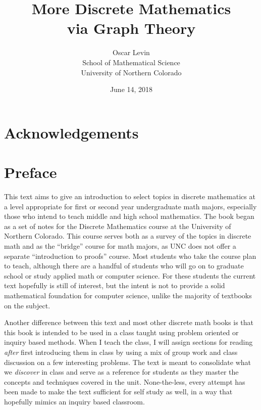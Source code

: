 \documentclass[10pt,]{book}
\title{More Discrete Mathematics\\
{\large via Graph Theory}}
\author{Oscar Levin\\
School of Mathematical Science\\
University of Northern Colorado
}
\date{June 14, 2018}
\theoremstyle{plain}
\theoremstyle{definition}
\theoremstyle{definition}
\theoremstyle{definition}
\theoremstyle{definition}
\numberwithin{equation}{chapter}
\begin{document}
\frontmatter


\chapter*{Acknowledgements}\label{acknowledgement-1}
\chapter*{Preface}\label{preface}
\hypertarget{p-1}{}%
This text aims to give an introduction to select topics in discrete mathematics at a level appropriate for first or second year undergraduate math majors, especially those who intend to teach middle and high school mathematics. The book began as a set of notes for the Discrete Mathematics course at the University of Northern Colorado. This course serves both as a survey of the topics in discrete math and as the ``bridge'' course for math majors, as UNC does not offer a separate ``introduction to proofs'' course. Most students who take the course plan to teach, although there are a handful of students who will go on to graduate school or study applied math or computer science. For these students the current text hopefully is still of interest, but the intent is not to provide a solid mathematical foundation for computer science, unlike the majority of textbooks on the subject.%
\par
\hypertarget{p-2}{}%
Another difference between this text and most other discrete math books is that this book is intended to be used in a class taught using problem oriented or inquiry based methods. When I teach the class, I will assign sections for reading \emph{after} first introducing them in class by using a mix of group work and class discussion on a few interesting problems. The text is meant to consolidate what we \emph{discover} in class and serve as a reference for students as they master the concepts and techniques covered in the unit. None-the-less, every attempt has been made to make the text sufficient for self study as well, in a way that hopefully mimics an inquiry based classroom.%
\par
\hypertarget{p-3}{}%
\end{document}
